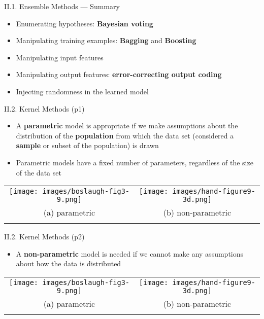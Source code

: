 \documentclass[handout]{beamer}
\newcommand{\strong}[1]{\textbf{\color{teal} #1}}
\newcommand{\stronger}[1]{\textbf{\color{purple} #1}}
\begin{document}
\begin{frame}{II.1. Ensemble Methods --- Summary}
\begin{itemize}
\item Enumerating hypotheses: \stronger{Bayesian voting}
\item Manipulating training examples: \stronger{Bagging} and \stronger{Boosting}
\item Manipulating input features
\item Manipulating output features: \stronger{error-correcting output coding}
\item Injecting randomness in the learned model
\end{itemize}
\end{frame}
\begin{frame}{II.2. Kernel Methods (p1)}
\begin{itemize}
\item A \stronger{parametric} model is appropriate if we make assumptions about the distribution of the \strong{population} from which the data set (considered a \strong{sample} or subset of the population) is drawn
\item Parametric models have a fixed number of parameters, regardless of the size of the data set %
\end{itemize}
\begin{center}
\begin{tabular}{cc}
\texttt{[image: images/boslaugh-fig3-9.png]} &
\texttt{[image: images/hand-figure9-3d.png]} \\
(a) parametric & (b) non-parametric \\
\cite[Figure 3.9]{boslaugh:2013} &
\cite[Figure 9.3d]{hand-et-al:2001} \\
\end{tabular}
\end{center}
\end{frame}
\begin{frame}{II.2. Kernel Methods (p2)}
\begin{itemize}
\item A \stronger{non-parametric} model is needed if we cannot make any assumptions about how the data is distributed
\end{itemize}
\begin{center}
\begin{tabular}{cc}
\texttt{[image: images/boslaugh-fig3-9.png]} &
\texttt{[image: images/hand-figure9-3d.png]} \\
(a) parametric & (b) non-parametric \\
\cite[Figure 3.9]{boslaugh:2013} &
\cite[Figure 9.3d]{hand-et-al:2001} \\
\end{tabular}
\end{center}
\end{frame}
\end{document}
